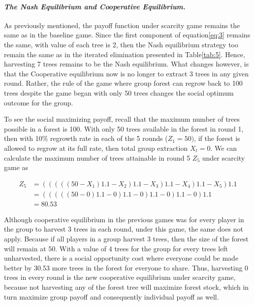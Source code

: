 \paragraph{\textit{The Nash Equilibrium and Cooperative Equilibrium.}}
As previously mentioned, the payoff function under scarcity game remains the same as in the baseline game. Since the first component of equation\ref{eq:3} remains the same, with value of each tree is 2, then the Nash equilibrium strategy too remain the same as in the iterated elimination presented in Table\ref{tab:5}. Hence, harvesting 7 trees remains to be the Nash equilibrium. What changes however, is that the Cooperative equilibrium now is no longer to extract 3 trees in any given round. Rather, the rule of the game where group forest can regrow back to 100 trees despite the game began with only 50 trees changes the social optimum outcome for the group.

\noindent To see the social maximizing payoff, recall that the maximum number of trees possible in a forest is 100. With only 50 trees available in the forest in round 1, then with 10\% regrowth rate in each of the 5 rounds ($Z_1=50)$, if the forest is allowed to regrow at its full rate, then total group extraction $X_t=0$. We can calculate the maximum number of trees attainable in round 5 $Z_5$ under scarcity game as

\begin{align*}
\label{eq:15}
    Z_{5} &= \left( \left( \left( \left( \left(50 - X_{1}\right) 1.1 - X_{2}\right) 1.1 - X_{3} \right) 1.1 - X_{4} \right) 1.1 - X_{5} \right) 1.1 \\
         &= \left( \left( \left( \left( \left(50 - 0\right) 1.1 - 0\right) 1.1 - 0 \right) 1.1 - 0 \right) 1.1 - 0 \right) 1.1 \\
         &= 80.53
\end{align*}

\noindent Although cooperative equilibrium in the previous games was for every player in the group to harvest 3 trees in each round, under this game, the same does not apply. Because if all players in a group harvest 3 trees, then the size of the forest will remain at 50. With a value of 4 trees for the group for every trees left unharvested, there is a social opportunity cost where everyone could be made better by 30.53 more trees in the forest for everyone to share. Thus, harvesting 0 trees in every round is the new cooperative equilibrium under scarcity game, because not harvesting any of the forest tree will maximize forest stock, which in turn maximize group payoff and consequently individual payoff as well.

